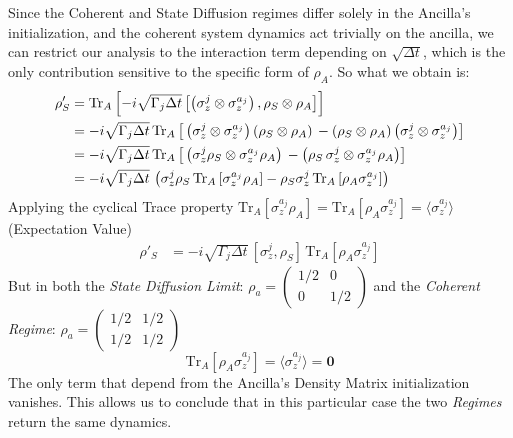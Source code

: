 \documentclass[a4paper,12pt]{article}
\begin{document}
	Since the Coherent and State Diffusion regimes differ solely in the Ancilla's initialization, and the coherent system dynamics act trivially on the ancilla, we can restrict our analysis to the interaction term depending on $ \sqrt{\Delta t} $, which is the only contribution sensitive to the specific form of $\rho_A$. So what we obtain is:
	\begin{align}
		\rho'_{S} &= \text{Tr}_A \left[- i \sqrt{\Gamma_j \Delta t} \left[ \left( \sigma_{z}^{j} \otimes \sigma_{z}^{a_j} \right) , \rho_{S} \otimes \rho_{A} \right] \right] \notag \\
		&= - i \sqrt{\Gamma_j \Delta t} \, \text{Tr}_A \left[ \, \left(\sigma_{z}^{j} \otimes \sigma_{z}^{a_j} \right) \left(\rho_{S} \otimes \rho_{A}\right) \, - \left(\rho_{S} \otimes \rho_{A}\right) \left(\sigma_{z}^{j} \otimes \sigma_{z}^{a_j} \right) \right] \notag \\
		&= - i \sqrt{\Gamma_j \Delta t} \, \text{Tr}_A \left[ \, \left(\sigma_{z}^{j} \rho_{S} \otimes \sigma_{z}^{a_j} \rho_{A} \right) \, - \left(\rho_{S} \, \sigma_{z}^{j}  \otimes \sigma_{z}^{a_j} \rho_{A} \right) \right] \notag \\
		&= - i \sqrt{\Gamma_j \Delta t} \, \left( \sigma_{z}^{j} \rho_{S} \, \text{Tr}_A \left[ \sigma_{z}^{a_j} \rho_{A} \right] - \rho_{S} \sigma_{z}^{j}  \, \text{Tr}_A \left[ \rho_{A} \sigma_{z}^{a_j} \right] \right) \notag
	\end{align}
	Applying the cyclical Trace property $ \text{Tr}_A \left[ \sigma_{z}^{a_j} \rho_{A} \right] = \text{Tr}_A \left[ \rho_{A} \sigma_{z}^{a_j} \right] = \langle \sigma_{z}^{a_j} \rangle $ (Expectation Value)
	\begin{align}
		\rho'_{S} &= - i \sqrt{\Gamma_j \Delta t} \, \left[ \sigma_{z}^{j}, \rho_{S} \right] \, \text{Tr}_A \left[ \rho_{A} \sigma_{z}^{a_j} \right]
		\label{eq:rho_evo_single_term_U_expansions}
	\end{align}
	But in both the \textit{State Diffusion Limit}: $ \rho_{a} = \begin{pmatrix} 1/2 & 0 \\ 0 & 1/2 \end{pmatrix} $ and the \textit{Coherent Regime}: $ \rho_{a} = \begin{pmatrix} 1/2 & 1/2 \\ 1/2 & 1/2 \end{pmatrix} $
	\begin{equation}
		\text{Tr}_A \left[ \rho_{A} \sigma_{z}^{a_j} \right] = \langle \sigma_{z}^{a_j} \rangle = \textbf{0}
		\label{eq:final_trace_to_0}
	\end{equation}
	The only term that depend from the Ancilla's Density Matrix initialization vanishes. This allows us to conclude that in this particular case the two \textit{Regimes} return the same dynamics.\\
\end{document}
